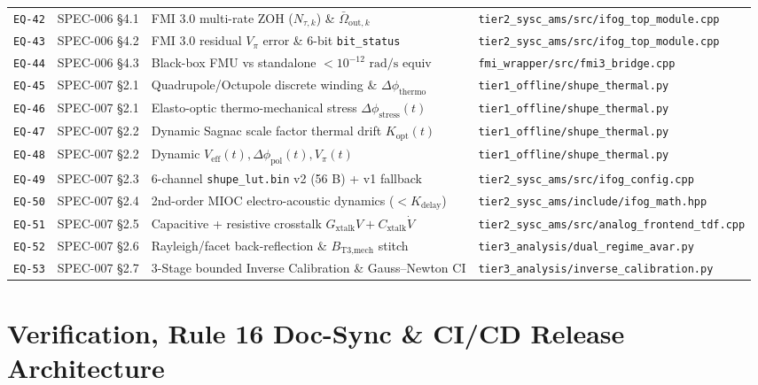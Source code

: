 \documentclass[11pt,a4paper]{article}
\begin{document}
\begin{longtable}{@{}l l l l@{}}
\texttt{EQ-42} & SPEC-006 \S 4.1 & FMI 3.0 multi-rate ZOH ($N_{\tau,k}$) \& $\bar{\Omega}_{\text{out},k}$ & \texttt{tier2\_sysc\_ams/src/ifog\_top\_module.cpp} \\
\texttt{EQ-43} & SPEC-006 \S 4.2 & FMI 3.0 residual $V_\pi$ error \& 6-bit \texttt{bit\_status} & \texttt{tier2\_sysc\_ams/src/ifog\_top\_module.cpp} \\
\texttt{EQ-44} & SPEC-006 \S 4.3 & Black-box FMU vs standalone $<10^{-12}\text{ rad/s}$ equiv & \texttt{fmi\_wrapper/src/fmi3\_bridge.cpp} \\
\texttt{EQ-45} & SPEC-007 \S 2.1 & Quadrupole/Octupole discrete winding \& $\Delta\phi_{\text{thermo}}$ & \texttt{tier1\_offline/shupe\_thermal.py} \\
\texttt{EQ-46} & SPEC-007 \S 2.1 & Elasto-optic thermo-mechanical stress $\Delta\phi_{\text{stress}}(t)$ & \texttt{tier1\_offline/shupe\_thermal.py} \\
\texttt{EQ-47} & SPEC-007 \S 2.2 & Dynamic Sagnac scale factor thermal drift $K_{\text{opt}}(t)$ & \texttt{tier1\_offline/shupe\_thermal.py} \\
\texttt{EQ-48} & SPEC-007 \S 2.2 & Dynamic $V_{\text{eff}}(t), \Delta\phi_{\text{pol}}(t), V_\pi(t)$ & \texttt{tier1\_offline/shupe\_thermal.py} \\
\texttt{EQ-49} & SPEC-007 \S 2.3 & 6-channel \texttt{shupe\_lut.bin} v2 (56 B) + v1 fallback & \texttt{tier2\_sysc\_ams/src/ifog\_config.cpp} \\
\texttt{EQ-50} & SPEC-007 \S 2.4 & 2nd-order MIOC electro-acoustic dynamics ($< K_{\text{delay}}$) & \texttt{tier2\_sysc\_ams/include/ifog\_math.hpp} \\
\texttt{EQ-51} & SPEC-007 \S 2.5 & Capacitive + resistive crosstalk $G_{\text{xtalk}}V + C_{\text{xtalk}}\dot{V}$ & \texttt{tier2\_sysc\_ams/src/analog\_frontend\_tdf.cpp} \\
\texttt{EQ-52} & SPEC-007 \S 2.6 & Rayleigh/facet back-reflection \& $B_{\text{T3,mech}}$ stitch & \texttt{tier3\_analysis/dual\_regime\_avar.py} \\
\texttt{EQ-53} & SPEC-007 \S 2.7 & 3-Stage bounded Inverse Calibration \& Gauss--Newton CI & \texttt{tier3\_analysis/inverse\_calibration.py} \\
\bottomrule
\end{longtable}
\normalsize

\section{Verification, Rule 16 Doc-Sync \& CI/CD Release Architecture}
\end{document}
